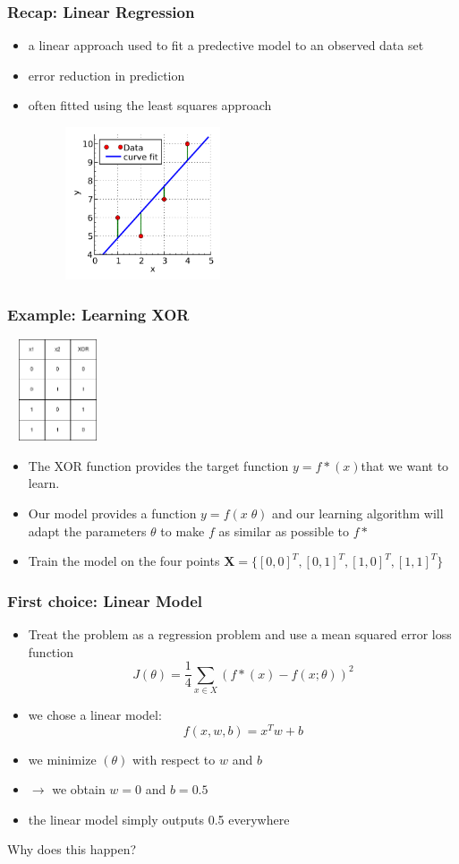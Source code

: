 \documentclass{beamer}
\begin{document}
\begin{frame}
	\frametitle{Recap: Linear Regression}
	\begin{itemize}
		\item a linear approach used to fit a predective model to an observed data set
		\item error reduction in prediction
		\item often fitted using the least squares approach
	\end{itemize}
	\center 
	\includegraphics[width= 80mm, height= 45mm]{linear_least_squares.png}
\end{frame}
\begin{frame}
	\frametitle{Example: Learning XOR}
	\center
	\includegraphics[width= 30mm , height = 30mm]{xor_tabel.png}
	\begin{itemize}
		\item The XOR function provides the target function $y = f\ast(x)$that we want to learn.
		\item Our model provides a function $y = f(x \; \theta)$ and
our learning algorithm will adapt the parameters $\theta $ to make
$f$ as similar as possible to $f\ast$
\item Train the model on the four points $\mathbf{X}= \{ [0,0]^T , [0,1]^T , [1,0]^T, [1,1]^T  \}$	
	\end{itemize}
\end{frame}
\begin{frame}
	\frametitle{First choice: Linear Model}
	\begin{itemize}
\item Treat the problem as a regression problem and use a mean squared error loss function $$ J(\theta) = \frac{1}{4} \sum_{x \in X}{(f\ast(x) - f(x; \theta))^2}$$
		\item we chose a linear model: $$ f(x, w, b) = x^Tw + b$$
		\item we minimize $(\theta)$ with respect to $w$ and $b$ 
		\item $\rightarrow$ we obtain $w = 0$ and $b= 0.5$ 
		\item the linear model simply outputs 0.5 everywhere
	\end{itemize}
	\center 
	Why does this happen?	
\end{frame}
\end{document}
